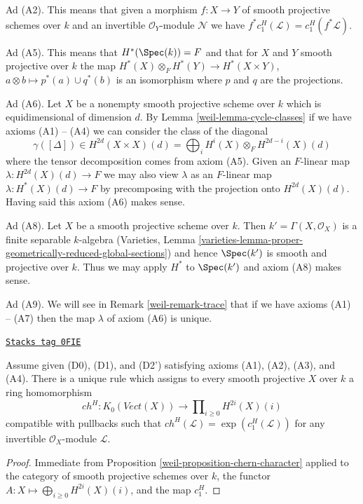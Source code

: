 \medskip\noindent
Ad (A2). This means that given a morphism $f : X \to Y$ of smooth projective
schemes over $k$ and an invertible $\mathcal{O}_Y$-module $\mathcal{N}$
we have $f^*c_1^H(\mathcal{L}) = c_1^H(f^*\mathcal{L})$.

\medskip\noindent
Ad (A5). This means that $H^*(\Spec(k)) = F$ and that for $X$ and $Y$ smooth
projective over $k$ the map $H^*(X) \otimes_F H^*(Y) \to H^*(X \times Y)$,
$a \otimes b \mapsto p^*(a) \cup q^*(b)$ is an isomorphism
where $p$ and $q$ are the projections.

\medskip\noindent
Ad (A6). Let $X$ be a nonempty smooth projective scheme over $k$
which is equidimensional of dimension $d$. By Lemma \ref{weil-lemma-cycle-classes}
if we have axioms (A1) -- (A4) we can consider the class of the diagonal
$$
\gamma([\Delta]) \in
H^{2d}(X \times X)(d) = \bigoplus\nolimits_i H^i(X) \otimes_F H^{2d - i}(X)(d)
$$
where the tensor decomposition comes from axiom (A5).
Given an $F$-linear map $\lambda : H^{2d}(X)(d) \to F$ we may also view
$\lambda$ as an $F$-linear map $\lambda : H^*(X)(d) \to F$ by precomposing
with the projection onto $H^{2d}(X)(d)$. Having said this axiom (A6)
makes sense.

\medskip\noindent
Ad (A8). Let $X$ be a smooth projective scheme over $k$.
Then $k' = \Gamma(X, \mathcal{O}_X)$ is a finite separable
$k$-algebra (Varieties, Lemma
\ref{varieties-lemma-proper-geometrically-reduced-global-sections})
and hence $\Spec(k')$ is smooth and projective over $k$.
Thus we may apply $H^*$ to $\Spec(k')$ and axiom (A8) makes sense.

\medskip\noindent
Ad (A9). We will see in Remark \ref{weil-remark-trace} that if we have
axioms (A1) -- (A7) then the map $\lambda$ of axiom (A6) is unique.

\begin{lemma}
\label{weil-lemma-chern-classes}
\href{https://stacks.math.columbia.edu/tag/0FIE}{\texttt{Stacks tag 0FIE}}

Assume given (D0), (D1), and (D2') satisfying axioms (A1), (A2), (A3), and (A4).
There is a unique rule which assigns to every smooth projective $X$ over $k$
a ring homomorphism
$$
ch^H :
K_0(\textit{Vect}(X))
\longrightarrow
\prod\nolimits_{i \geq 0} H^{2i}(X)(i)
$$
compatible with pullbacks such that
$ch^H(\mathcal{L}) = \exp(c_1^H(\mathcal{L}))$
for any invertible $\mathcal{O}_X$-module $\mathcal{L}$.
\end{lemma}

\begin{proof}

Immediate from Proposition \ref{weil-proposition-chern-character}
applied to the category of smooth projective schemes over $k$,
the functor $A : X \mapsto \bigoplus_{i \geq 0} H^{2i}(X)(i)$,
and the map $c_1^H$.
\end{proof}


